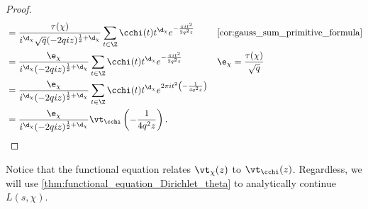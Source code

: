 \begin{proof}
\begin{align*}
          &= \frac{\tau(\chi)}{i^{\d_{\chi}}\sqrt{q}(-2qiz)^{\frac{1}{2}+\d_{\chi}}}\sum_{t \in \Z}\cchi(t)t^{\d_{\chi}}e^{-\frac{\pi it^{2}}{2q^{2}z}} && \text{\cref{cor:gauss_sum_primitive_formula}} \\
          &= \frac{\e_{\chi}}{i^{\d_{\chi}}(-2qiz)^{\frac{1}{2}+\d_{\chi}}}\sum_{t \in \Z}\cchi(t)t^{\d_{\chi}}e^{-\frac{\pi it^{2}}{2q^{2}z}} && \text{\(\e_{\chi} = \frac{\tau(\chi)}{\sqrt{q}}\)} \\
          &= \frac{\e_{\chi}}{i^{\d_{\chi}}(-2qiz)^{\frac{1}{2}+\d_{\chi}}}\sum_{t \in \Z}\cchi(t)t^{\d_{\chi}}e^{2\pi it^{2}\left(-\frac{1}{4q^{2}z}\right)} \\
          &=  \frac{\e_{\chi}}{i^{\d_{\chi}}(-2qiz)^{\frac{1}{2}+\d_{\chi}}}\vt_{\cchi}\left(-\frac{1}{4q^{2}z}\right).
        \end{align*}
      \end{proof}

      Notice that the functional equation relates \(\vt_{\chi}(z)\) to \(\vt_{\cchi}(z)\). Regardless, we will use \cref{thm:functional_equation_Dirichlet_theta} to analytically continue \(L(s,\chi)\).
